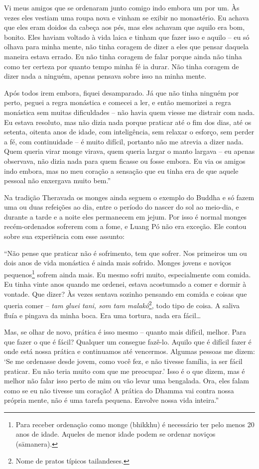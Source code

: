 Vi meus amigos que se ordenaram junto comigo indo embora um por um. Às
vezes eles vestiam uma roupa nova e vinham se exibir no monastério. Eu
achava que eles eram doidos da cabeça aos pés, mas eles achavam que
aquilo era bom, bonito. Eles haviam voltado à vida laica e tinham que
fazer isso e aquilo -- eu só olhava para minha mente, não tinha coragem
de dizer a eles que pensar daquela maneira estava errado. Eu não tinha
coragem de falar porque ainda não tinha como ter certeza por quanto
tempo minha fé ia durar. Não tinha coragem de dizer nada a ninguém,
apenas pensava sobre isso na minha mente.

Após todos irem embora, fiquei desamparado. Já que não tinha ninguém por
perto, peguei a regra monástica e comecei a ler, e então memorizei a
regra monástica sem muitas dificuldades -- não havia quem viesse me
distrair com nada. Eu estava resoluto, mas não dizia nada porque
praticar até o fim dos dias, até os setenta, oitenta anos de idade, com
inteligência, sem relaxar o esforço, sem perder a fé, com continuidade
-- é muito difícil, portanto não me atrevia a dizer nada. Quem queria
virar monge virava, quem queria largar o manto largava -- eu apenas
observava, não dizia nada para quem ficasse ou fosse embora. Eu via os
amigos indo embora, mas no meu coração a sensação que eu tinha era de
que aquele pessoal não enxergava muito bem.''

Na tradição Theravada os monges ainda seguem o exemplo do Buddha e só
fazem uma ou duas refeições ao dia, entre o período do nascer do sol ao
meio-dia, e durante a tarde e a noite eles permanecem em jejum. Por isso
é normal monges recém-ordenados sofrerem com a fome, e Luang Pó não era
exceção. Ele contou sobre sua experiência com esse assunto:

``Não pense que praticar não é sofrimento, tem que sofrer. Nos primeiros
um ou dois anos de vida monástica é ainda mais sofrido. Monges jovens e
noviços pequenos\footnote{Para receber ordenação como monge (bhikkhu) é
  necessário ter pelo menos 20 anos de idade. Aqueles de menor idade
  podem se ordenar noviços (sāmanera).} sofrem ainda mais. Eu mesmo
sofri muito, especialmente com comida. Eu tinha vinte anos quando me
ordenei, estava acostumado a comer e dormir à vontade. Que dizer? Às
vezes sentava sozinho pensando em comida e coisas que queria comer --
\emph{tam gluei tani, som tam malakó}\footnote{Nome de pratos típicos
  tailandeses.}\emph{,} todo tipo de coisa. A saliva fluía e pingava da
minha boca. Era uma tortura, nada era fácil\ldots{}

Mas, se olhar de novo, prática é isso mesmo -- quanto mais difícil,
melhor. Para que fazer o que é fácil? Qualquer um consegue fazê-lo.
Aquilo que é difícil fazer é onde está nossa prática e continuamos até
vencermos. Algumas pessoas me dizem: `Se me ordenasse desde jovem, como
você fez, e não tivesse família, ia ser fácil praticar. Eu não teria
muito com que me preocupar.' Isso é o que dizem, mas é melhor não falar
isso perto de mim ou vão levar uma bengalada. Ora, eles falam como se eu
não tivesse um coração! A prática do Dhamma vai contra nossa própria
mente, não é uma tarefa pequena. Envolve nossa vida inteira.''
